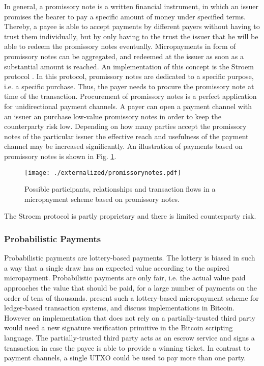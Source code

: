 In general, a promissory note is a written financial instrument, in which an issuer promises the bearer to pay a specific amount of money under specified terms. Thereby, a payee is able to accept payments by different payers without having to trust them individually, but by only having to the trust the issuer that he will be able to redeem the promissory notes eventually. Micropayments in form of promissory notes can be aggregated, and redeemed at the issuer as soon as a substantial amount is reached. An implementation of this concept is the Stroem protocol \parencite{strawpay}. In this protocol, promissory notes are dedicated to a specific purpose, i.e. a specific purchase. Thus, the payer needs to procure the promissory note at time of the transaction. Procurement of promissory notes is a perfect application for unidirectional payment channels. A payer can open a payment channel with an issuer an purchase low-value promissory notes in order to keep the counterparty risk low. Depending on how many parties accept the promissory notes of the particular issuer the effective reach and usefulness of the payment channel may be increased significantly. An illustration of payments based on promissory notes is shown in Fig. \ref{fig:promissorynotes}.

\begin{figure}
\centering
\texttt{[image: ./externalized/promissorynotes.pdf]}
\caption{Possible participants, relationships and transaction flows in a micropayment scheme based on promissory notes.}
\label{fig:promissorynotes}
\end{figure}

The Stroem protocol is partly proprietary and there is limited counterparty risk.

\subsubsection{Probabilistic Payments}

Probabilistic payments \parencite{wheeler1996transactions,rivest1996payword,rivest1997electronic} are lottery-based payments. The lottery is biased in such a way that a single draw has an expected value according to the aspired micropayment. Probabilistic payments are only fair, i.e. the actual value paid approaches the value that should be paid, for a large number of payments on the order of tens of thousands. 
\cite{Pass:2015:MDC:2810103.2813713} present such a lottery-based micropayment scheme for ledger-based transaction systems, and discuss implementations in Bitcoin. However an implementation that does not rely on a partially-trusted third party would need a new signature verification primitive in the Bitcoin scripting language. The partially-trusted third party acts as an escrow service and signs a transaction in case the payee is able to provide a winning ticket. In contrast to payment channels, a single \ac{UTXO} could be used to pay more than one party.

